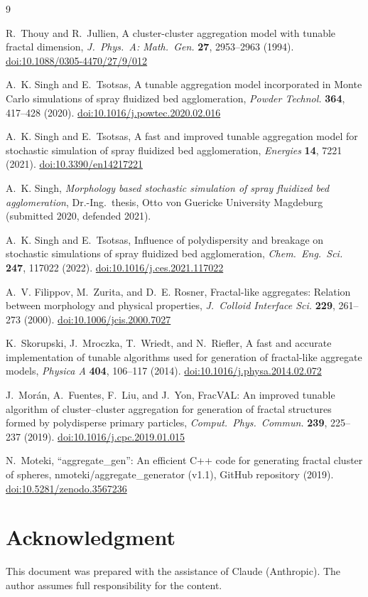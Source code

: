 \documentclass[11pt,a4paper]{article}
\begin{document}
\begin{thebibliography}{9}

R.~Thouy and R.~Jullien,
A cluster-cluster aggregation model with tunable fractal dimension,
\emph{J.\ Phys.\ A: Math.\ Gen.} \textbf{27}, 2953--2963 (1994).
\href{https://doi.org/10.1088/0305-4470/27/9/012}{doi:10.1088/0305-4470/27/9/012}

A.~K. Singh and E.~Tsotsas,
A tunable aggregation model incorporated in Monte Carlo simulations of spray fluidized bed agglomeration,
\emph{Powder Technol.} \textbf{364}, 417--428 (2020).
\href{https://doi.org/10.1016/j.powtec.2020.02.016}{doi:10.1016/j.powtec.2020.02.016}

A.~K. Singh and E.~Tsotsas,
A fast and improved tunable aggregation model for stochastic simulation of spray fluidized bed agglomeration,
\emph{Energies} \textbf{14}, 7221 (2021).
\href{https://doi.org/10.3390/en14217221}{doi:10.3390/en14217221}

A.~K. Singh,
\emph{Morphology based stochastic simulation of spray fluidized bed agglomeration},
Dr.-Ing.\ thesis, Otto von Guericke University Magdeburg (submitted 2020, defended 2021).

A.~K. Singh and E.~Tsotsas,
Influence of polydispersity and breakage on stochastic simulations of spray fluidized bed agglomeration,
\emph{Chem.\ Eng.\ Sci.} \textbf{247}, 117022 (2022).
\href{https://doi.org/10.1016/j.ces.2021.117022}{doi:10.1016/j.ces.2021.117022}

A.~V. Filippov, M.~Zurita, and D.~E. Rosner,
Fractal-like aggregates: Relation between morphology and physical properties,
\emph{J.\ Colloid Interface Sci.} \textbf{229}, 261--273 (2000).
\href{https://doi.org/10.1006/jcis.2000.7027}{doi:10.1006/jcis.2000.7027}

K.~Skorupski, J.~Mroczka, T.~Wriedt, and N.~Riefler,
A fast and accurate implementation of tunable algorithms used for generation of fractal-like aggregate models,
\emph{Physica A} \textbf{404}, 106--117 (2014).
\href{https://doi.org/10.1016/j.physa.2014.02.072}{doi:10.1016/j.physa.2014.02.072}

J.~Morán, A.~Fuentes, F.~Liu, and J.~Yon,
FracVAL: An improved tunable algorithm of cluster--cluster aggregation for generation of fractal structures formed by polydisperse primary particles,
\emph{Comput.\ Phys.\ Commun.} \textbf{239}, 225--237 (2019).
\href{https://doi.org/10.1016/j.cpc.2019.01.015}{doi:10.1016/j.cpc.2019.01.015}

N.~Moteki,
``aggregate\_gen'': An efficient C++ code for generating fractal cluster of spheres,
nmoteki/aggregate\_generator (v1.1), GitHub repository (2019).
\href{https://doi.org/10.5281/zenodo.3567236}{doi:10.5281/zenodo.3567236}

\end{thebibliography}

\section*{Acknowledgment}
This document was prepared with the assistance of Claude (Anthropic).
The author assumes full responsibility for the content.
\end{document}
